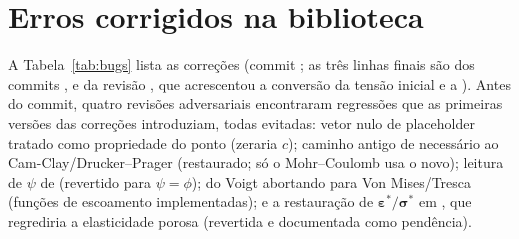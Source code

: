 \documentclass[11pt,a4paper]{article}
\newcommand{\sig}{\bm{\sigma}}
\newcommand{\eps}{\bm{\varepsilon}}
\begin{document}
\section{Erros corrigidos na biblioteca}\label{sec:bugs}

A Tabela~\ref{tab:bugs} lista as correções (commit ; as três linhas finais são dos commits
,  e da revisão , que acrescentou a conversão da tensão inicial e
a ). Antes do commit, quatro revisões adversariais encontraram
regressões que as primeiras versões das correções introduziam, todas evitadas:
vetor  nulo de placeholder tratado como propriedade do ponto (zeraria $c$); caminho
antigo de  necessário ao Cam-Clay/Drucker--Prager (restaurado; só o
Mohr--Coulomb usa o novo); leitura de $\psi$ de  (revertido para $\psi=\phi$);
 do Voigt abortando para Von Mises/Tresca (funções de escoamento implementadas); e a
restauração de $\eps^*/\sig^*$ em , que regrediria a elasticidade porosa
(revertida e documentada como pendência).
\end{document}
